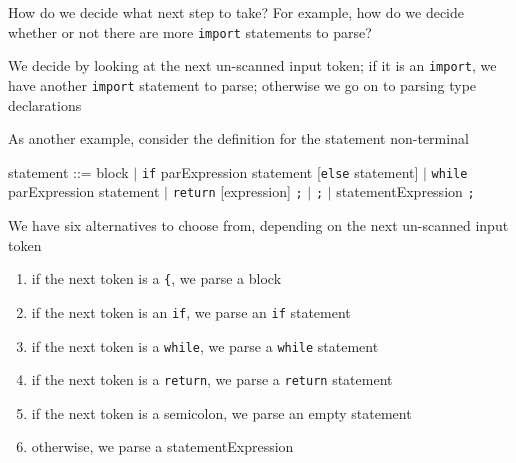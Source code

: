 \documentclass[8pt,a4paper,compress]{beamer}
\newcommand{\mm}[1]{$#1$}
\newenvironment{spaced}
{
\smallskip
\hspace{.5cm}
\begin{minipage}[c]{\textwidth}
}
{
\end{minipage}
\smallskip
}
\begin{document}
\begin{frame}[fragile]
\pause

How do we decide what next step to take? For example, how do we decide whether or not there are more \lstinline{import} statements to parse? 

\pause
\bigskip

We decide by looking at the next un-scanned input token; if it is an \lstinline{import}, we have another \lstinline{import} statement to parse; otherwise we go on to parsing type declarations

\pause
\bigskip

As another example, consider the definition for the statement non-terminal

\text{ }
\begin{spaced}
\begin{production}
statement ::= block
                  \mm{|} \lstinline{if} parExpression statement [\lstinline{else} statement]
                  \mm{|} \lstinline{while} parExpression statement
                  \mm{|} \lstinline{return} [expression] \lstinline{;}
                  \mm{|} \lstinline{;}
                  \mm{|} statementExpression \lstinline{;}
\end{production}
\end{spaced}

\pause
\bigskip

We have six alternatives to choose from, depending on the next un-scanned input token

\begin{enumerate}
\item if the next token is a \lstinline${$, we parse a block
\item if the next token is an \lstinline{if}, we parse an \lstinline{if} statement
\item if the next token is a \lstinline{while}, we parse a \lstinline{while} statement
\item if the next token is a \lstinline{return}, we parse a \lstinline{return} statement
\item if the next token is a semicolon, we parse an empty statement
\item otherwise, we parse a statementExpression
\end{enumerate}
\end{frame}
\end{document}
